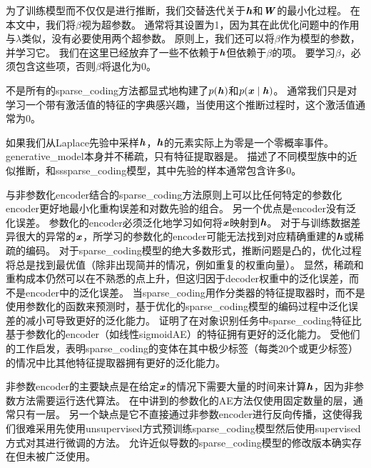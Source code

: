 为了训练模型而不仅仅是进行推断，我们交替迭代关于$\boldsymbol{\mathit{h}}$和$\boldsymbol{\mathit{W}}$的最小化过程。
在本文中，我们将$\beta$视为超参数。
通常将其设置为1，因为其在此优化问题中的作用与$\lambda$类似，没有必要使用两个超参数。 
原则上，我们还可以将$\beta$作为模型的参数，并学习它。
我们在这里已经放弃了一些不依赖于$\boldsymbol{\mathit{h}}$但依赖于$\beta$的项。
要学习$\beta$，必须包含这些项，否则$\beta$将退化为0。


不是所有的\gls{sparse_coding}方法都显式地构建了$p(\boldsymbol{\mathit{h}})$和$p(\boldsymbol{\mathit{x}}\mid\boldsymbol{\mathit{h}})$。 
通常我们只是对学习一个带有激活值的特征的字典感兴趣，当使用这个推断过程时，这个激活值通常为0。

如果我们从Laplace先验中采样$\boldsymbol{\mathit{h}}$，$\boldsymbol{\mathit{h}}$的元素实际上为零是一个零概率事件。
\gls{generative_model}本身并不稀疏，只有特征提取器是。
\citet{Goodfeli-et-al-TPAMI-Deep-PrePrint-2013-small}描述了不同模型族中的近似推断，和\gls{ss}\gls{sparse_coding}模型，其中先验的样本通常包含许多0。

与非参数化\gls{encoder}结合的\gls{sparse_coding}方法原则上可以比任何特定的参数化\gls{encoder}更好地最小化重构误差和对数先验的组合。
另一个优点是\gls{encoder}没有泛化误差。
参数化的\gls{encoder}必须泛化地学习如何将$\boldsymbol{\mathit{x}}$映射到$\boldsymbol{\mathit{h}}$。
对于与训练数据差异很大的异常的$\boldsymbol{\mathit{x}}$，所学习的参数化的\gls{encoder}可能无法找到对应精确重建的$\boldsymbol{\mathit{h}}$或稀疏的编码。
对于\gls{sparse_coding}模型的绝大多数形式，推断问题是凸的，优化过程将总是找到最优值（除非出现简并的情况，例如重复的权重向量）。
显然，稀疏和重构成本仍然可以在不熟悉的点上升，但这归因于\gls{decoder}权重中的泛化误差，而不是\gls{encoder}中的泛化误差。
当\gls{sparse_coding}用作分类器的特征提取器时，而不是使用参数化的函数来预测时，基于优化的\gls{sparse_coding}模型的编码过程中泛化误差的减小可导致更好的泛化能力。
\citet{Coates2011b}证明了在对象识别任务中\gls{sparse_coding}特征比基于参数化的\gls{encoder}（如线性\gls{sigmoid}\gls{AE}）的特征拥有更好的泛化能力。
受他们的工作启发，\citet{Goodfeli-et-al-TPAMI-Deep-PrePrint-2013-small}表明\gls{sparse_coding}的变体在其中极少标签（每类20个或更少标签）的情况中比其他特征提取器拥有更好的泛化能力。



非参数\gls{encoder}的主要缺点是在给定$\boldsymbol{\mathit{x}}$的情况下需要大量的时间来计算$\boldsymbol{\mathit{h}}$，因为非参数方法需要运行迭代算法。
在中讲到的参数化的\gls{AE}方法仅使用固定数量的层，通常只有一层。
另一个缺点是它不直接通过非参数\gls{encoder}进行反向传播，这使得我们很难采用先使用\gls{unsupervised}方式预训练\gls{sparse_coding}模型然后使用\gls{supervised}方式对其进行微调的方法。
允许近似导数的\gls{sparse_coding}模型的修改版本确实存在但未被广泛使用\citep{Bradley+Bagnell-2009-small}。

